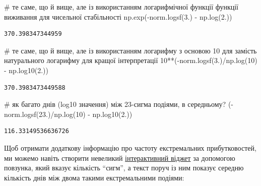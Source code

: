 \documentclass[
  letterpaper,
]{report}
\newenvironment{Shaded}{\begin{snugshade}}{\end{snugshade}}
\newcommand{\CommentTok}[1]{\textcolor[rgb]{0.37,0.37,0.37}{#1}}
\newcommand{\DecValTok}[1]{\textcolor[rgb]{0.68,0.00,0.00}{#1}}
\newcommand{\FloatTok}[1]{\textcolor[rgb]{0.68,0.00,0.00}{#1}}
\newcommand{\NormalTok}[1]{\textcolor[rgb]{0.00,0.23,0.31}{#1}}
\newcommand{\OperatorTok}[1]{\textcolor[rgb]{0.37,0.37,0.37}{#1}}
\begin{document}
\begin{Shaded}
\begin{Highlighting}[]
\CommentTok{\# те саме, що й вище, але із використанням логарифмічної функції функції виживання для чисельної стабільності}
\NormalTok{np.exp(}\OperatorTok{{-}}\NormalTok{norm.logsf(}\FloatTok{3.}\NormalTok{) }\OperatorTok{{-}}\NormalTok{ np.log(}\FloatTok{2.}\NormalTok{))}
\end{Highlighting}
\end{Shaded}

\begin{verbatim}
370.398347344959
\end{verbatim}

\begin{Shaded}
\begin{Highlighting}[]
\CommentTok{\# те саме, що й вище, але із використанням логарифму з основою 10 для замість натурального логарифму для кращої інтерпретації}
\DecValTok{10}\OperatorTok{**}\NormalTok{(}\OperatorTok{{-}}\NormalTok{norm.logsf(}\FloatTok{3.}\NormalTok{)}\OperatorTok{/}\NormalTok{np.log(}\DecValTok{10}\NormalTok{) }\OperatorTok{{-}}\NormalTok{ np.log10(}\FloatTok{2.}\NormalTok{))}
\end{Highlighting}
\end{Shaded}

\begin{verbatim}
370.3983473449588
\end{verbatim}

\begin{Shaded}
\begin{Highlighting}[]
\CommentTok{\# як багато днів (log10 значення) між 23{-}сигма подіями, в середньому?}
\NormalTok{(}\OperatorTok{{-}}\NormalTok{norm.logsf(}\FloatTok{23.}\NormalTok{)}\OperatorTok{/}\NormalTok{np.log(}\DecValTok{10}\NormalTok{) }\OperatorTok{{-}}\NormalTok{ np.log10(}\FloatTok{2.}\NormalTok{))}
\end{Highlighting}
\end{Shaded}

\begin{verbatim}
116.33149536636726
\end{verbatim}

Щоб отримати додаткову інформацію про частоту екстремальних
прибутковостей, ми можемо навіть створити невеликий
\href{https://ipywidgets.readthedocs.io/en/latest/examples/Widget\%20Basics.html}{інтерактивний
віджет} за допомогою повзунка, який вказує кількість ``сигм'', а текст
поруч із ним показує середню кількість днів між двома такими
екстремальними подіями:
\end{document}
